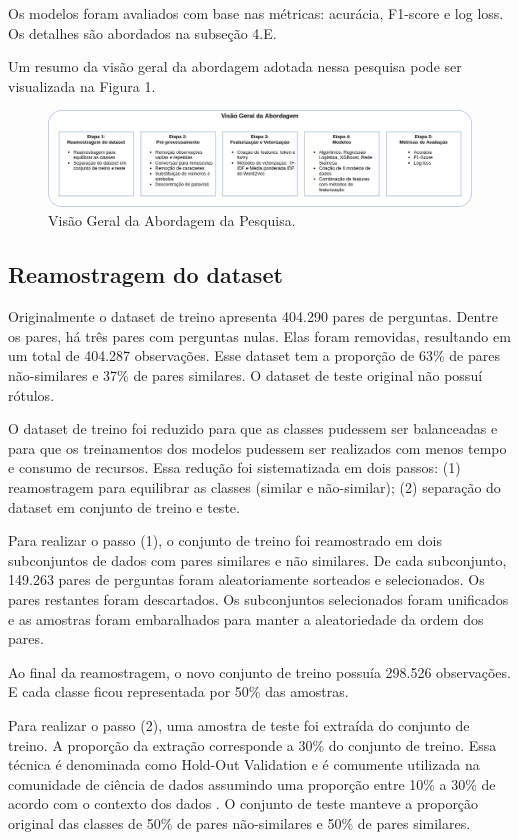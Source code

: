 \documentclass[conference]{IEEEtran}
\begin{document}
Os modelos foram avaliados com base nas métricas: acurácia, F1-score e log loss.
Os detalhes são abordados na subseção 4.E.

Um resumo da visão geral da abordagem adotada nessa pesquisa pode ser visualizada na Figura 1.

\begin{figure}[htbp]
  \includegraphics[width=\textwidth]{abordagem.png}
  \caption{Visão Geral da Abordagem da Pesquisa.}
\end{figure}

\subsection{Reamostragem do dataset}

Originalmente o dataset de treino apresenta 404.290 pares de perguntas. Dentre os pares, há três pares com perguntas nulas. Elas foram removidas, resultando em um total de 404.287 observações. Esse dataset tem a proporção de 63\% de pares não-similares e 37\% de pares similares. O dataset de teste original não possuí rótulos.

O dataset de treino foi reduzido para que as classes pudessem ser balanceadas e para que os treinamentos dos modelos pudessem ser realizados com menos tempo e consumo de recursos. Essa redução foi sistematizada em dois passos: (1) reamostragem para equilibrar as classes (similar e não-similar); (2) separação do dataset em conjunto de treino e teste.

Para realizar o passo (1), o conjunto de treino foi reamostrado em dois subconjuntos de dados com pares similares e não similares. De cada subconjunto, 149.263 pares de perguntas foram aleatoriamente sorteados e selecionados. Os pares restantes foram descartados. Os subconjuntos selecionados foram unificados e as amostras foram embaralhados para manter a aleatoriedade da ordem dos pares.

Ao final da reamostragem, o novo conjunto de treino possuía 298.526 observações. E cada classe ficou representada por 50\% das amostras.

Para realizar o passo (2), uma amostra de teste foi extraída do conjunto de treino. A proporção da extração corresponde a 30\% do conjunto de treino. Essa técnica é denominada como Hold-Out Validation e é comumente utilizada na comunidade de ciência de dados assumindo uma proporção entre 10\% a 30\% de acordo com o contexto dos dados \cite{Yadav2016}. O conjunto de teste manteve a proporção original das classes de 50\% de pares não-similares e 50\% de pares similares.
\end{document}
